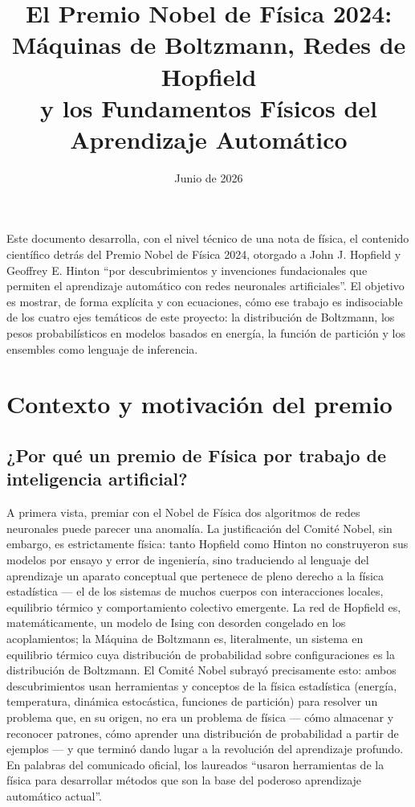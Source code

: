 \documentclass[12pt]{article}
\title{El Premio Nobel de Física 2024:\\ Máquinas de Boltzmann, Redes de Hopfield\\ y los Fundamentos Físicos del Aprendizaje Automático}
\author{}
\date{Junio de 2026}
\begin{document}
\maketitle

\noindent Este documento desarrolla, con el nivel técnico de una nota de física, el contenido científico detrás del Premio Nobel de Física 2024, otorgado a John J. Hopfield y Geoffrey E. Hinton ``por descubrimientos y invenciones fundacionales que permiten el aprendizaje automático con redes neuronales artificiales''. El objetivo es mostrar, de forma explícita y con ecuaciones, cómo ese trabajo es indisociable de los cuatro ejes temáticos de este proyecto: la distribución de Boltzmann, los pesos probabilísticos en modelos basados en energía, la función de partición y los ensembles como lenguaje de inferencia.

\section{Contexto y motivación del premio}

\subsection{¿Por qué un premio de Física por trabajo de inteligencia artificial?}

A primera vista, premiar con el Nobel de Física dos algoritmos de redes neuronales puede parecer una anomalía. La justificación del Comité Nobel, sin embargo, es estrictamente física: tanto Hopfield como Hinton no construyeron sus modelos por ensayo y error de ingeniería, sino traduciendo al lenguaje del aprendizaje un aparato conceptual que pertenece de pleno derecho a la física estadística --- el de los sistemas de muchos cuerpos con interacciones locales, equilibrio térmico y comportamiento colectivo emergente. La red de Hopfield es, matemáticamente, un modelo de Ising con desorden congelado en los acoplamientos; la Máquina de Boltzmann es, literalmente, un sistema en equilibrio térmico cuya distribución de probabilidad sobre configuraciones es la distribución de Boltzmann. El Comité Nobel subrayó precisamente esto: ambos descubrimientos usan herramientas y conceptos de la física estadística (energía, temperatura, dinámica estocástica, funciones de partición) para resolver un problema que, en su origen, no era un problema de física --- cómo almacenar y reconocer patrones, cómo aprender una distribución de probabilidad a partir de ejemplos --- y que terminó dando lugar a la revolución del aprendizaje profundo. En palabras del comunicado oficial, los laureados ``usaron herramientas de la física para desarrollar métodos que son la base del poderoso aprendizaje automático actual''.
\end{document}
